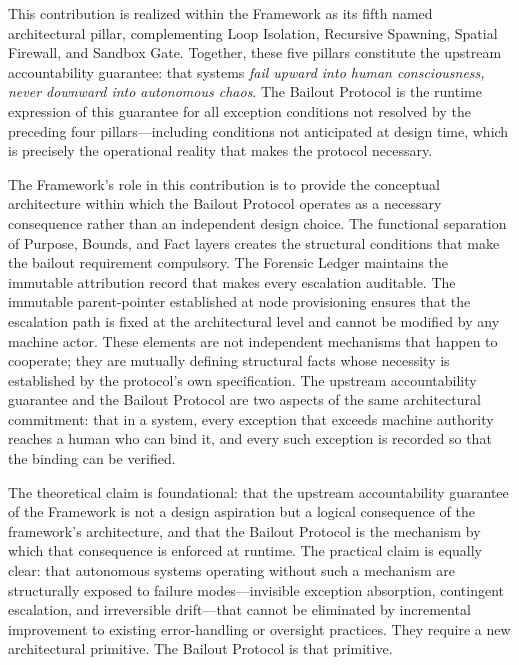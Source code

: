 This contribution is realized within the \bxthree{} Framework as its fifth named architectural pillar, complementing Loop Isolation, Recursive Spawning, Spatial Firewall, and Sandbox Gate. Together, these five pillars constitute the upstream accountability guarantee: that \bxthree{} systems \emph{fail upward into human consciousness, never downward into autonomous chaos}. The Bailout Protocol is the runtime expression of this guarantee for all exception conditions not resolved by the preceding four pillars---including conditions not anticipated at design time, which is precisely the operational reality that makes the protocol necessary.

The \bxthree{} Framework's role in this contribution is to provide the conceptual architecture within which the Bailout Protocol operates as a necessary consequence rather than an independent design choice. The functional separation of Purpose, Bounds, and Fact layers creates the structural conditions that make the bailout requirement compulsory. The Forensic Ledger maintains the immutable attribution record that makes every escalation auditable. The immutable parent-pointer established at node provisioning ensures that the escalation path is fixed at the architectural level and cannot be modified by any machine actor. These elements are not independent mechanisms that happen to cooperate; they are mutually defining structural facts whose necessity is established by the protocol's own specification. The upstream accountability guarantee and the Bailout Protocol are two aspects of the same architectural commitment: that in a \bxthree{} system, every exception that exceeds machine authority reaches a human who can bind it, and every such exception is recorded so that the binding can be verified.

The theoretical claim is foundational: that the upstream accountability guarantee of the \bxthree{} Framework is not a design aspiration but a logical consequence of the framework's architecture, and that the Bailout Protocol is the mechanism by which that consequence is enforced at runtime. The practical claim is equally clear: that autonomous systems operating without such a mechanism are structurally exposed to failure modes---invisible exception absorption, contingent escalation, and irreversible drift---that cannot be eliminated by incremental improvement to existing error-handling or oversight practices. They require a new architectural primitive. The Bailout Protocol is that primitive.

